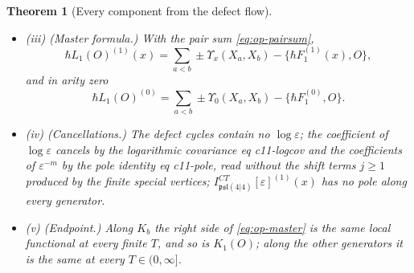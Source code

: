 \documentclass[11pt]{article}
\numberwithin{equation}{section}
\theoremstyle{plain}
\newtheorem{theorem}{Theorem}[section]
\theoremstyle{definition}
\newcommand{\psl}{\mathfrak{psl}(4|4)}
\begin{document}
\begin{theorem}[Every component from the defect flow]
\begin{itemize}
\item (iii) (Master formula.) With the pair sum \eqref{eq:op-pairsum},
\begin{equation}
\hbar L_1(O)^{(1)}(x)=\sum_{a<b}\pm\Upsilon_x(X_a,X_b)-\big\{\hbar F_1^{(1)}(x),O\big\},
\label{eq:op-master}
\end{equation}
and in arity zero
\begin{equation}
\hbar L_1(O)^{(0)}=\sum_{a<b}\pm\Upsilon_0(X_a,X_b)-\big\{\hbar F_1^{(0)},O\big\}.
\label{eq:op-master0}
\end{equation}
\item (iv) (Cancellations.) The defect cycles contain no $\log\varepsilon$; the coefficient of $\log\varepsilon$ cancels by the logarithmic covariance eq c11-logcov and the coefficients of $\varepsilon^{-m}$ by the pole identity eq c11-pole, read without the shift terms $j\ge1$ produced by the finite special vertices; $I^{CT}_{\psl}[\varepsilon]^{(1)}(x)$ has no pole along every generator.
\item (v) (Endpoint.) Along $K_b$ the right side of \eqref{eq:op-master} is the same local functional at every finite $T$, and so is $K_1(O)$; along the other generators it is the same at every $T\in(0,\infty]$.
\end{itemize}
\end{theorem}
\end{document}
